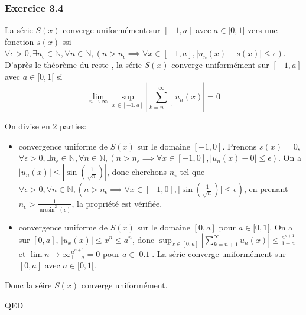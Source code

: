 \documentclass[]{book}
\theoremstyle{definition}
\newcommand{\bb}[1]{\mathbb{#1}}
\newcommand{\N}{\bb{N}}
\begin{document}
\subsubsection*{Exercice 3.4}
La s\'erie $S(x)$  converge uniform\'ement sur $[-1,a]$ avec $a \in [0,1[$ vers une fonction $s(x)$ ssi $\forall \epsilon > 0, \exists n_{\epsilon} \in \N,  \forall n \in \N, (n > n_{\epsilon} \implies \forall x \in [-1,a], \lvert u_n(x) - s(x) \rvert \le \epsilon)$. \\

D'apr\`es le th\'eor\`eme du reste , la s\'erie $S(x)$  converge uniform\'ement sur $[-1,a]$ avec $a \in [0,1[$ si 
$$
\lim_{n \to \infty}\sup_{x \in [-1,a]} \left \lvert \sum_{k = n+1}^{\infty} {u_n(x)} \right \rvert = 0
$$	

On divise en 2 parties:
\begin{itemize}
\item convergence uniforme de $S(x)$ sur le domaine $[-1,0]$. Prenons $s(x) = 0$, $\forall \epsilon > 0, \exists n_{\epsilon} \in \N,  \forall n \in \N, (n > n_{\epsilon} \implies \forall x \in [-1,0], \lvert u_n(x) - 0 \rvert \le \epsilon)$. On a $\lvert u_n(x) \rvert \le |\sin(\frac{1}{\sqrt{n}})| $, donc cherchons $n_{\epsilon}$ tel que $\forall \epsilon > 0, \forall n \in \N, (n > n_{\epsilon} \implies \forall x \in [-1,0], \lvert \sin(\frac{1}{\sqrt{n}}) \rvert \le \epsilon)$, en prenant $n_{\epsilon} > \frac{1}{\arcsin^2(\epsilon)}$, la propri\'et\'e est v\'erifi\'ee. 
\item convergence uniforme de $S(x)$ sur le domaine $[0,a]$ pour $a \in [0,1[$. On a sur $[0,a]$, $\lvert u_x(x) \rvert \le x^n \le  a^n $, donc $\sup_{x \in [0,a]} \left \lvert \sum_{k = n+1}^{\infty} {u_n(x)} \right \rvert \le \frac{a^{n+1}}{1-a}$ et $\lim{n \to \infty}{\frac{a^{n+1}}{1-a}} = 0$ pour $a \in [0.1[$. La s\'erie converge uniform\'ement sur $[0,a]$ avec $a \in [0,1[$.
\end{itemize}

Donc la s\'eire $S(x)$ converge uniform\'ement.

QED
\end{document}
